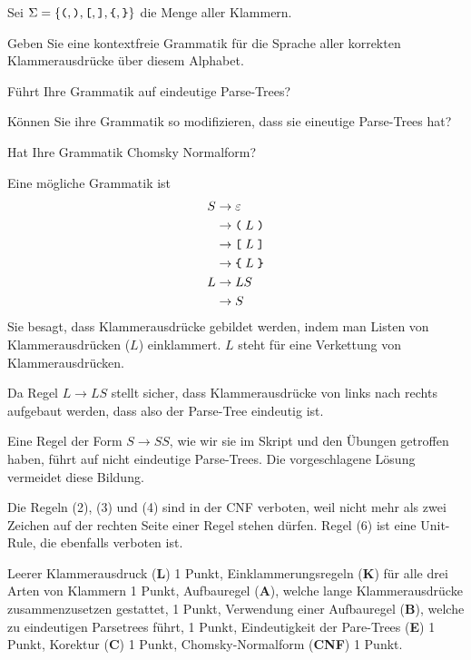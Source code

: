 Sei $\Sigma=\{
\texttt{(},
\texttt{)},
\texttt{[},
\texttt{]},
\verb+{+,
\verb+}+
\}$
die Menge aller Klammern.
\begin{teilaufgaben}
\item
Geben Sie eine kontextfreie Grammatik für die Sprache aller korrekten
Klammerausdrücke über diesem Alphabet.
\item
Führt Ihre Grammatik auf eindeutige Parse-Trees?
\item
Können Sie ihre Grammatik so modifizieren, dass sie eineutige Parse-Trees hat?
\item
Hat Ihre Grammatik Chomsky Normalform?
\end{teilaufgaben}


\begin{loesung}
\begin{teilaufgaben}
\item
Eine mögliche Grammatik ist
\begin{align}
S&\rightarrow \varepsilon 
\\
 &\rightarrow \texttt{(} \; L \; \texttt{)}
\\
 &\rightarrow \texttt{[} \; L \; \texttt{]}
\\
 &\rightarrow \texttt{\char`\{} \; L \; \texttt{\char`\}}
\\
L&\rightarrow LS
\\
 &\rightarrow S
\end{align}
Sie besagt, dass Klammerausdrücke gebildet werden, indem man Listen
von Klammerausdrücken ($L$) einklammert.
$L$ steht für eine Verkettung von Klammerausdrücken.
\item
Da Regel $L\rightarrow LS$ stellt sicher, dass Klammerausdrücke von links
nach rechts aufgebaut werden, dass also der Parse-Tree eindeutig ist.
\item
Eine Regel der Form $S\rightarrow SS$, wie wir sie im Skript und den
Übungen getroffen haben, führt auf nicht eindeutige Parse-Trees.
Die vorgeschlagene Lösung vermeidet diese Bildung.
\item
Die Regeln 
(2), (3) und (4) sind in der CNF verboten, weil nicht mehr als zwei
Zeichen auf der rechten Seite einer Regel stehen dürfen.
Regel (6) ist eine Unit-Rule, die ebenfalls verboten ist.
\qedhere
\end{teilaufgaben}
\end{loesung}

\begin{bewertung}
Leerer Klammerausdruck ({\bf L}) 1 Punkt,
Einklammerungsregeln ({\bf K}) für alle drei Arten von Klammern 1 Punkt,
Aufbauregel ({\bf A}), welche lange Klammerausdrücke zusammenzusetzen
gestattet, 1 Punkt,
Verwendung einer Aufbauregel ({\bf B}), welche zu eindeutigen Parsetrees führt,
1 Punkt,
Eindeutigkeit der Pare-Trees ({\bf E}) 1 Punkt,
Korektur ({\bf C}) 1 Punkt,
Chomsky-Normalform ({\bf CNF}) 1 Punkt.
\end{bewertung}


